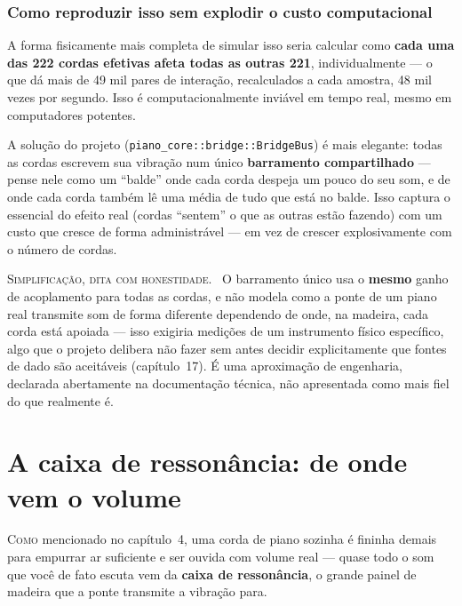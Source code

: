 \documentclass[11pt,oneside]{book}
\newcommand{\nova}[1]{\textsc{\color{accent}#1.}~}
\newcommand{\opening}[2]{\lettrine[lines=2,loversize=0.08,lraise=0.02]{#1}{#2}}
\begin{document}
\subsection*{Como reproduzir isso sem explodir o custo computacional}

A forma fisicamente mais completa de simular isso seria calcular como
\textbf{cada uma das 222 cordas efetivas afeta todas as outras 221},
individualmente --- o que dá mais de 49 mil pares de interação,
recalculados a cada amostra, 48 mil vezes por segundo. Isso é
computacionalmente inviável em tempo real, mesmo em computadores potentes.

A solução do projeto (\texttt{piano\_core::bridge::BridgeBus}) é mais
elegante: todas as cordas escrevem sua vibração num único
\textbf{barramento compartilhado} --- pense nele como um \enquote{balde}
onde cada corda despeja um pouco do seu som, e de onde cada corda também lê
uma média de tudo que está no balde. Isso captura o essencial do efeito
real (cordas \enquote{sentem} o que as outras estão fazendo) com um custo
que cresce de forma administrável --- em vez de crescer explosivamente com
o número de cordas.

\begin{newword}
\nova{Simplificação, dita com honestidade} O barramento único usa o
\textbf{mesmo} ganho de acoplamento para todas as cordas, e não modela como
a ponte de um piano real transmite som de forma diferente dependendo de
onde, na madeira, cada corda está apoiada --- isso exigiria medições de um
instrumento físico específico, algo que o projeto delibera não fazer sem
antes decidir explicitamente que fontes de dado são aceitáveis
(capítulo~17). É uma aproximação de engenharia, declarada abertamente na
documentação técnica, não apresentada como mais fiel do que realmente é.
\end{newword}

\chapter{A caixa de ressonância: de onde vem o volume}

\opening{C}{omo} mencionado no capítulo~4, uma corda de piano sozinha é
fininha demais para empurrar ar suficiente e ser ouvida com volume real ---
quase todo o som que você de fato escuta vem da \textbf{caixa de
ressonância}, o grande painel de madeira que a ponte transmite a vibração
para.
\end{document}
